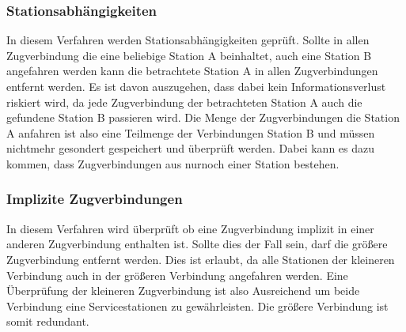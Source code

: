 \subsubsection{Stationsabhängigkeiten}
In diesem Verfahren werden Stationsabhängigkeiten geprüft. Sollte in allen Zugverbindung die eine beliebige Station A beinhaltet, auch eine Station B angefahren werden kann die betrachtete Station A in allen Zugverbindungen entfernt werden. Es ist davon auszugehen, dass dabei kein Informationsverlust riskiert wird, da jede Zugverbindung der betrachteten Station A auch die gefundene Station B passieren wird. Die Menge der Zugverbindungen die Station A anfahren ist also eine Teilmenge der Verbindungen Station B und müssen nichtmehr gesondert gespeichert und überprüft werden. Dabei kann es dazu kommen, dass Zugverbindungen aus nurnoch einer Station bestehen.\\

\subsubsection{Implizite Zugverbindungen}
In diesem Verfahren wird überprüft ob eine Zugverbindung implizit in einer anderen Zugverbindung enthalten ist. Sollte dies der Fall sein, darf die größere Zugverbindung entfernt werden. Dies ist erlaubt, da alle Stationen der kleineren Verbindung auch in der größeren Verbindung angefahren werden. Eine Überprüfung der kleineren Zugverbindung ist also Ausreichend um beide Verbindung eine Servicestationen zu gewährleisten. Die größere Verbindung ist somit redundant.\\

